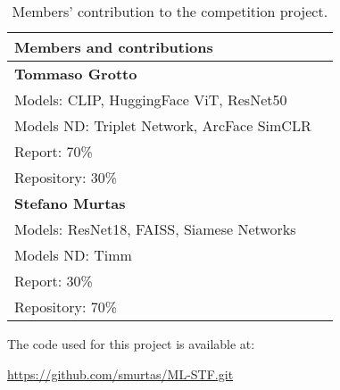 \documentclass[10pt,twocolumn,letterpaper]{article}
\begin{document}
\begin{table}[ht]
\centering
\caption{Members' contribution to the competition project.}
\begin{tabular}{ll}
\toprule
\textbf{Members and contributions} \\
\midrule
\textbf{Tommaso Grotto} & \\
\quad Models: CLIP, HuggingFace ViT, ResNet50 & \\
\quad Models ND: Triplet Network, ArcFace SimCLR & \\
\quad Report: 70\% & \\
\quad Repository: 30\% & \\
\addlinespace
\textbf{Stefano Murtas} & \\
\quad Models: ResNet18, FAISS, Siamese Networks & \\
\quad Models ND: Timm & \\
\quad Report: 30\% & \\
\quad Repository: 70\% & \\
\bottomrule
\end{tabular}
\end{table}

The code used for this project is available at:

\url{https://github.com/smurtas/ML-STF.git}
\end{document}
